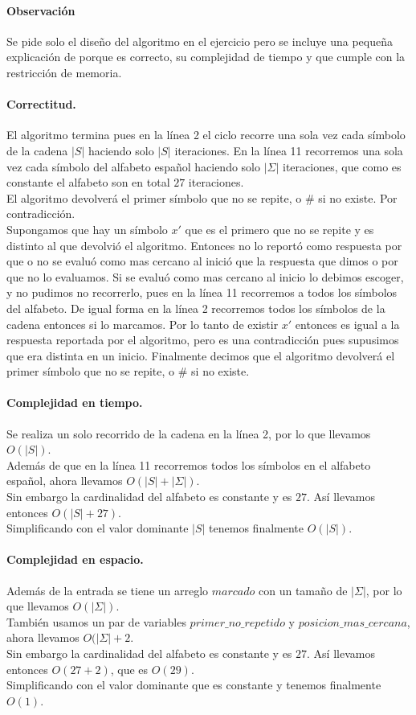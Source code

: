 \documentclass[12pt]{article}
\begin{document}
\paragraph{Observación} Se pide solo el diseño del algoritmo en el ejercicio pero se incluye una pequeña explicación de porque es correcto, su complejidad de tiempo y que cumple con la restricción de memoria.
\paragraph{Correctitud.} 
El algoritmo termina pues en la línea 2 el ciclo recorre una sola vez cada símbolo de la cadena $|S|$ haciendo solo $|S|$ iteraciones. En la línea 11 recorremos una sola vez cada símbolo del alfabeto español haciendo solo $|\Sigma|$ iteraciones, que como es constante el alfabeto son en total $27$ iteraciones.\\
El algoritmo devolverá el primer símbolo que no se repite, o \# si no existe.
Por contradicción.\\
Supongamos que hay un símbolo $x'$ que es el primero que no se repite y es distinto al que devolvió el algoritmo. Entonces no lo reportó como respuesta por que o no se evaluó como mas cercano al inició que la respuesta que dimos o por que no lo evaluamos. Si se evaluó como mas cercano al inicio lo debimos escoger, y no pudimos no recorrerlo, pues en la línea 11 recorremos a todos los símbolos del alfabeto. De igual forma en la línea 2 recorremos todos los símbolos de la cadena entonces si lo marcamos. Por lo tanto de existir $x'$ entonces es igual a la respuesta reportada por el algoritmo, pero es una contradicción pues supusimos que era distinta en un inicio. Finalmente decimos que el algoritmo devolverá el primer símbolo que no se repite, o \# si no existe.
\paragraph{Complejidad en tiempo.} Se realiza un solo recorrido de la cadena en la línea 2, por lo que llevamos $O(|S|)$.\\ Además de que en la línea 11 recorremos todos los símbolos en el alfabeto español, ahora llevamos $O(|S| + |\Sigma|)$. \\ Sin embargo la cardinalidad del alfabeto es constante y es $27$. Así llevamos entonces $O(|S| + 27)$.  \\ Simplificando con el valor dominante $|S|$ tenemos finalmente $O(|S|)$.
\paragraph{Complejidad en espacio.} Además de la entrada se tiene un arreglo $marcado$ con un tamaño de $|\Sigma|$, por lo que llevamos $O(|\Sigma|)$.\\ También usamos un par de variables $primer\_no\_repetido$ y $posicion\_mas\_cercana$, ahora llevamos $O(|\Sigma| + 2$. \\ Sin embargo la cardinalidad del alfabeto es constante y es $27$. Así llevamos entonces $O(27 + 2)$, que es $O(29)$.  \\ Simplificando con el valor dominante que es constante y tenemos finalmente $O(1)$.
\end{document}
